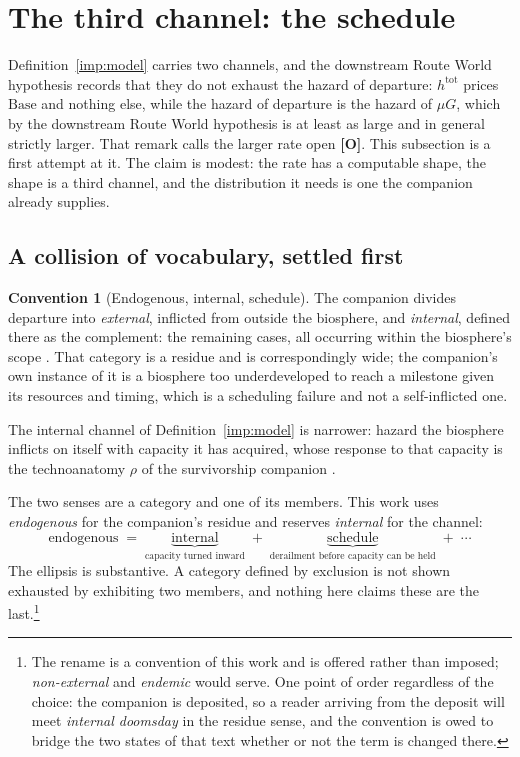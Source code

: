 \documentclass[11pt]{article}
\theoremstyle{plain}
\theoremstyle{definition}
\newtheorem{convention}[theorem]{Convention}
\theoremstyle{remark}
\begin{document}
\section{The third channel: the schedule}\label{sec:schedule}


Definition~\ref{imp:model} carries two channels, and
the downstream Route World hypothesis records that they do not exhaust the
hazard of departure: $h^{\mathrm{tot}}$ prices $\mathrm{Base}$ and
nothing else, while the hazard of departure is the hazard of $\mu G$,
which by the downstream Route World hypothesis is at least as large and in general
strictly larger. That remark calls the larger rate open \textbf{[O]}. This subsection is a first attempt at it. The claim is modest: the rate
has a computable shape, the shape is a third channel, and the
distribution it needs is one the companion already supplies.

\subsection{A collision of vocabulary, settled first}
\label{sch:subsub:vocab}

\begin{convention}[Endogenous, internal, schedule]\label{sch:conv:internal}
The companion divides departure into \emph{external}, inflicted from
outside the biosphere, and \emph{internal}, defined there as the
complement: the remaining cases, all occurring within the biosphere's
scope \cite{Nexus}. That category is a residue and is correspondingly
wide; the companion's own instance of it is a biosphere too
underdeveloped to reach a milestone given its resources and timing,
which is a scheduling failure and not a self-inflicted one.

The internal channel of Definition~\ref{imp:model} is narrower: hazard the
biosphere inflicts on itself with capacity it has acquired, whose
response to that capacity is the technoanatomy $\rho$ of
the survivorship companion \cite{SurvA}.

The two senses are a category and one of its members. This work uses
\emph{endogenous} for the companion's residue and reserves
\emph{internal} for the channel:
\begin{equation}\label{sch:eq:partition}
\text{endogenous}\;=\;\underbrace{\text{internal}}_{\text{capacity
turned inward}}\;+\;\underbrace{\text{schedule}}_{\text{derailment
before capacity can be held}}\;+\;\cdots
\end{equation}
The ellipsis is substantive. A category defined by exclusion is not
shown exhausted by exhibiting two members, and nothing here claims these
are the last.\footnote{The rename is a convention of this work and is
offered rather than imposed; \emph{non-external} and \emph{endemic}
would serve. One point of order regardless of the choice: the companion
is deposited, so a reader arriving from the deposit will meet
\emph{internal doomsday} in the residue sense, and the convention is
owed to bridge the two states of that text whether or not the term is
changed there.}
\end{convention}
\end{document}
